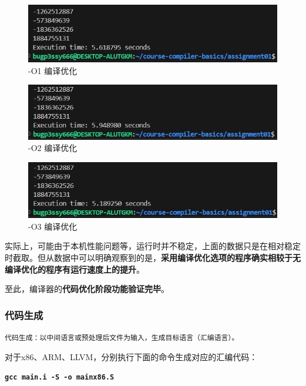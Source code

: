 \documentclass[UTF8,a4paper,10pt]{ctexart}
\begin{document}
\begin{figure} [H]
    \centering
    \includegraphics[width=0.7\linewidth]{ccl_2.jpg}
    \caption{-O1 编译优化}
    \label{fig:placeholder}
\end{figure}

\begin{figure} [H]
    \centering
    \includegraphics[width=0.7\linewidth]{ccl_3.jpg}
    \caption{-O2 编译优化}
    \label{fig:placeholder}
\end{figure}

\begin{figure} [H]
    \centering
    \includegraphics[width=0.7\linewidth]{ccl_4.jpg}
    \caption{-O3 编译优化}
    \label{fig:placeholder}
\end{figure}

实际上，可能由于本机性能问题等，运行时并不稳定，上面的数据只是在相对稳定时截取。但从数据中可以明确观察到的是，\textbf{采用编译优化选项的程序确实相较于无编译优化的程序有运行速度上的提升}。

\vspace{1em}

至此，编译器的\textbf{代码优化阶段功能验证完毕}。


\subsubsection{代码生成}
\texttt{\large{代码生成：以中间语言或预处理后文件为输入，生成目标语言（汇编语言）。}}

\vspace{1em}

对于x86、ARM、LLVM，分别执行下面的命令生成对应的汇编代码：

\begin{center}
    \textcolor{deepblue}{\textbf{\texttt{\large{gcc main.i -S -o mainx86.S}}}}
\end{center}
\end{document}

